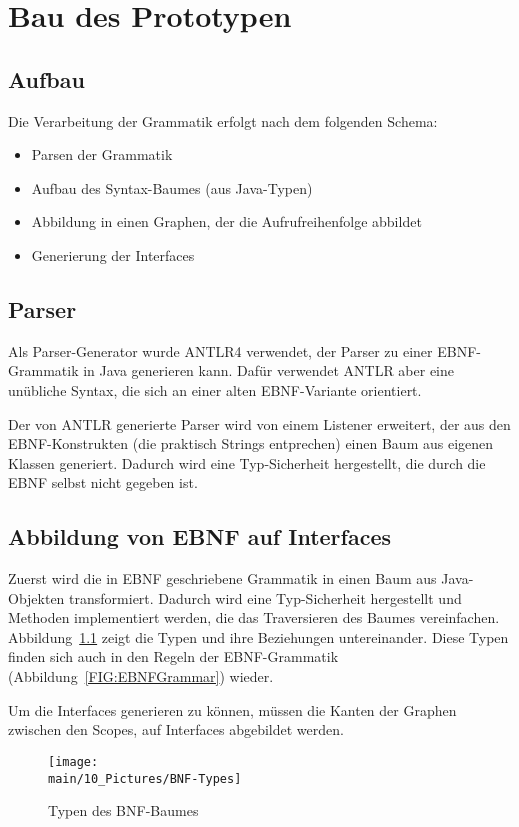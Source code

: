 \documentclass[../InterneDSLs.tex]{subfiles}
\begin{document}
\chapter{Bau des Prototypen}

\section{Aufbau}
Die Verarbeitung der Grammatik erfolgt nach dem folgenden Schema:
\begin{itemize}
	\item Parsen der Grammatik
	\item Aufbau des Syntax-Baumes (aus Java-Typen)
	\item Abbildung in einen Graphen, der die Aufrufreihenfolge abbildet
	\item Generierung der Interfaces
\end{itemize}

\section{Parser}
Als Parser-Generator wurde ANTLR4 verwendet, der Parser zu einer EBNF-Grammatik in Java generieren kann. Dafür verwendet ANTLR aber eine unübliche Syntax, die sich an einer alten EBNF-Variante orientiert.

Der von ANTLR generierte Parser wird von einem Listener erweitert, der aus den EBNF-Konstrukten (die praktisch Strings entprechen) einen Baum aus eigenen Klassen generiert. Dadurch wird eine Typ-Sicherheit hergestellt, die durch die EBNF selbst nicht gegeben ist.

\section{Abbildung von EBNF auf Interfaces}
Zuerst wird die in EBNF geschriebene Grammatik in einen Baum aus Java-Objekten transformiert. Dadurch wird eine Typ-Sicherheit hergestellt und Methoden implementiert werden, die das Traversieren des Baumes vereinfachen. Abbildung~\ref{FIG:TypesBNF} zeigt die Typen und ihre Beziehungen untereinander. Diese Typen finden sich auch in den Regeln der EBNF-Grammatik (Abbildung~\ref{FIG:EBNFGrammar}) wieder.

Um die Interfaces generieren zu können, müssen die Kanten der Graphen zwischen den Scopes, auf Interfaces abgebildet werden.

\begin{figure}[ht]
\centering
\texttt{[image: \\main/10\_Pictures/BNF-Types]}
\caption{Typen des BNF-Baumes}
\label{FIG:TypesBNF}
\end{figure}
\end{document}
